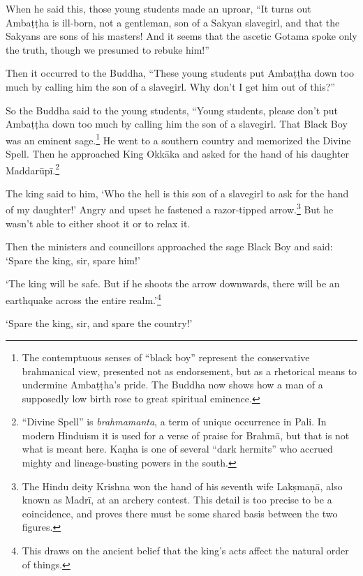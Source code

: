 \documentclass[12pt,openany]{book}%
\begin{document}
When he said this, those young students made an uproar, “It turns out \textsanskrit{Ambaṭṭha} is ill-born, not a gentleman, son of a Sakyan slavegirl, and that the Sakyans are sons of his masters! And it seems that the ascetic Gotama spoke only the truth, though we presumed to rebuke him!” 

Then it occurred to the Buddha, “These young students put \textsanskrit{Ambaṭṭha} down too much by calling him the son of a slavegirl. Why don’t I get him out of this?” 

So the Buddha said to the young students, “Young students, please don’t put \textsanskrit{Ambaṭṭha} down too much by calling him the son of a slavegirl. That Black Boy was an eminent sage.\footnote{The contemptuous senses of “black boy” represent the conservative brahmanical view, presented not as endorsement, but as a rhetorical means to undermine \textsanskrit{Ambaṭṭha}’s pride. The Buddha now shows how a man of a supposedly low birth rose to great spiritual eminence. } He went to a southern country and memorized the Divine Spell. Then he approached King \textsanskrit{Okkāka} and asked for the hand of his daughter \textsanskrit{Maddarūpī}.\footnote{“Divine Spell” is \textit{brahmamanta}, a term of unique occurrence in Pali. In modern Hinduism it is used for a verse of praise for \textsanskrit{Brahmā}, but that is not what is meant here. \textsanskrit{Kaṇha} is one of several “dark hermits” who accrued mighty and lineage-busting powers in the south. } 

The king said to him, ‘Who the hell is this son of a slavegirl to ask for the hand of my daughter!’ Angry and upset he fastened a razor-tipped arrow.\footnote{The Hindu deity Krishna won the hand of his seventh wife \textsanskrit{Lakṣmaṇā}, also known as \textsanskrit{Madrī}, at an archery contest. This detail is too precise to be a coincidence, and proves there must be some shared basis between the two figures. } But he wasn’t able to either shoot it or to relax it. 

Then the ministers and councillors approached the sage Black Boy and said: ‘Spare the king, sir, spare him!’ 

‘The king will be safe. But if he shoots the arrow downwards, there will be an earthquake across the entire realm.’\footnote{This draws on the ancient belief that the king’s acts affect the natural order of things. } 

‘Spare the king, sir, and spare the country!’ 
\end{document}
